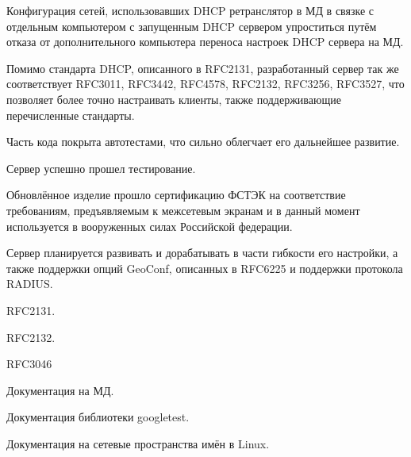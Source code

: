 \documentclass[14pt,a4paper]{extarticle}
\begin{document}
Конфигурация сетей, использовавших DHCP ретранслятор в МД в связке с отдельным компьютером с запущенным DHCP сервером упроститься путём отказа от дополнительного компьютера переноса настроек DHCP сервера на МД.

Помимо стандарта DHCP, описанного в RFC2131, разработанный сервер так же соответствует RFC3011, RFC3442, RFC4578, RFC2132, RFC3256, RFC3527, что позволяет более точно настраивать клиенты, также поддерживающие перечисленные стандарты.

Часть кода покрыта автотестами, что сильно облегчает его дальнейшее развитие.

Сервер успешно прошел тестирование.

Обновлённое изделие прошло сертификацию ФСТЭК на соответствие требованиям, предъявляемым к межсетевым экранам и в данный момент используется в вооруженных силах Российской федерации.

Сервер планируется развивать и дорабатывать в части гибкости его настройки, а также поддержки опций GeoConf, описанных в RFC6225 и поддержки протокола RADIUS.

\pagebreak
{}


\begin{thebibliography}{9}
RFC2131.

RFC2132.

RFC3046

Документация на МД.

Документация библиотеки googletest.

Документация на сетевые пространства имён в Linux.

\end{thebibliography}
\end{document}
